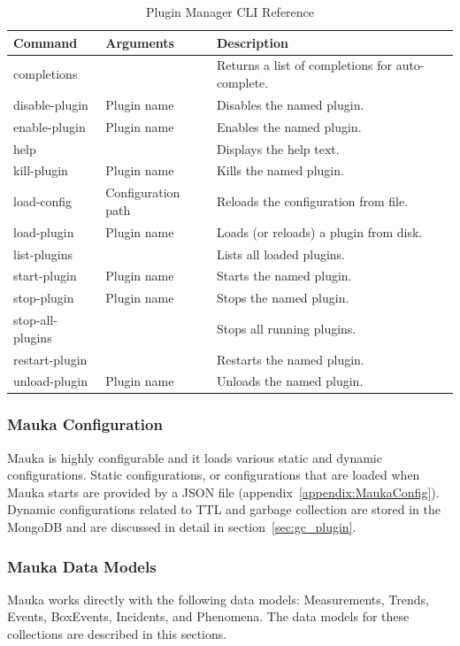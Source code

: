 \begin{table}[H]
	\centering
	\caption{Plugin Manager CLI Reference}
	\begin{tabularx}{\textwidth}{llX}
		\toprule
		\textbf{Command} & \textbf{Arguments} & \textbf{Description} \\
		\midrule
		completions & & Returns a list of completions for auto-complete. \\
		disable-plugin & Plugin name & Disables the named plugin. \\
		enable-plugin & Plugin name & Enables the named plugin. \\
		help & & Displays the help text. \\
		kill-plugin & Plugin name & Kills the named plugin. \\
		load-config & Configuration path & Reloads the configuration from file. \\
		load-plugin & Plugin name & Loads (or reloads) a plugin from disk. \\
		list-plugins & & Lists all loaded plugins. \\
		start-plugin & Plugin name & Starts the named plugin. \\
		stop-plugin & Plugin name & Stops the named plugin. \\
		stop-all-plugins & & Stops all running plugins. \\
		restart-plugin & & Restarts the named plugin. \\
		unload-plugin & Plugin name & Unloads the named plugin. \\
		\bottomrule
	\end{tabularx}
	\label{table:PluginManager}
\end{table}

\subsubsection{Mauka Configuration}
Mauka is highly configurable and it loads various static and dynamic configurations. Static configurations, or configurations that are loaded when Mauka starts are provided by a JSON file (appendix~\ref{appendix:MaukaConfig}). Dynamic configurations related to TTL and garbage collection are stored in the MongoDB and are discussed in detail in section~\ref{sec:gc_plugin}.

\subsubsection{Mauka Data Models}
Mauka works directly with the following data models: Measurements, Trends, Events, BoxEvents, Incidents, and Phenomena. The data models for these collections are described in this sections.

